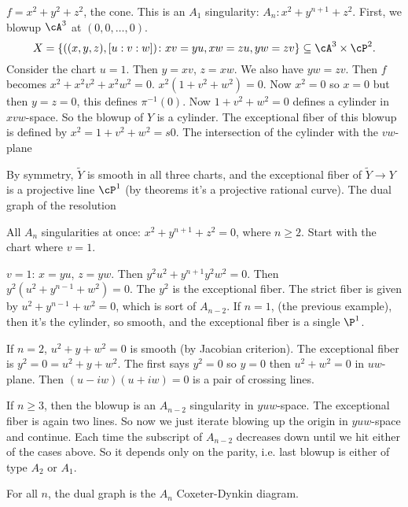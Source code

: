 \begin{ex}
$f= x^2+y^2+z^2$, the cone. This is an $A_1$ singularity: $A_n: x^2+y^{n+1}+z^2$. First, we blowup $\cA^3$ at $(0,0,\ldots,0)$. 
	\[
	X= \{ ((x,y,z), [u:v:w]) \colon xv=yu, xw=zu, yw=zv \} \subseteq \cA^3 \times \cP^2.
	\]
Consider the chart $u=1$. Then $y= xv$, $z= xw$. We also have $yw=zv$. Then $f$ becomes $x^2+x^2v^2+x^2w^2=0$. $x^2(1+v^2+w^2)=0$. Now $x^2=0$ so $x=0$ but then $y=z=0$, this defines $\pi^{-1}(0)$. Now $1+v^2+w^2=0$ defines a cylinder in $xvw$-space. So the blowup of $Y$ is a cylinder. The exceptional fiber of this blowup is defined by $x^2= 1+v^2+w^2= s0$. The intersection of the cylinder with the $vw$-plane 

 By symmetry, $\tilde{Y}$ is smooth in all three charts, and the exceptional fiber of $\tilde{Y}  \to Y$ is a projective line $\cP^1$ (by theorems it's a projective rational curve). The dual graph of the resolution 

\end{ex}




\begin{ex}
All $A_n$ singularities at once: $x^2+y^{n+1}+z^2=0$, where $n \geq 2$. Start with the chart where $v=1$. 




$v=1$: $x=yu$, $z=yw$. Then $y^2u^2+y^{n+1} y^2w^2=0$. Then $y^2(u^2+y^{n-1}+w^2)=0$. The $y^2$ is the exceptional fiber. The strict fiber is given by $u^2+y^{n-1}+w^2=0$, which is sort of $A_{n-2}$. If $n=1$, (the previous example), then it's the cylinder, so smooth, and the exceptional fiber is a single $\P^1$. 

If $n=2$, $u^2+y+w^2=0$ is smooth (by Jacobian criterion). The exceptional fiber is $y^2=0=u^2+y+w^2$. The first says $y^2=0$ so $y=0$ then $u^2+w^2=0$ in $uw$-plane. Then $(u-iw)(u+iw)=0$ is a pair of crossing lines. 


If $n \geq 3$, then the blowup  is an $A_{n-2}$ singularity in $yuw$-space. The exceptional fiber is again two lines. So now we just iterate blowing up the origin in $yuw$-space and continue. Each time the subscript of $A_{n-2}$ decreases down until we hit either of the cases above. So it depends only on the parity, i.e. last blowup is either of type $A_2$ or $A_1$. 


For all $n$, the dual graph is the $A_n$ Coxeter-Dynkin diagram. 


\end{ex}



